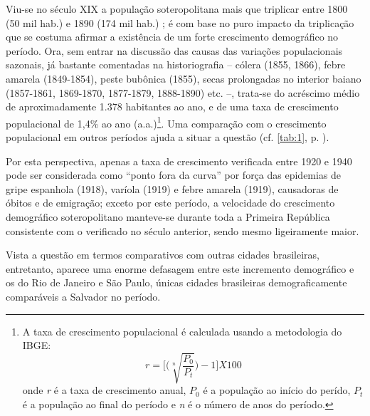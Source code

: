Viu-se no século XIX a população soteropolitana mais que triplicar entre 1800 (50 mil hab.) e 1890 (174 mil hab.) \cite[p.~70]{sampaio_formas_1999}; é com base no puro impacto da triplicação que se costuma afirmar a existência de um forte crescimento demográfico no período. Ora, sem entrar na discussão das causas das variações populacionais sazonais, já bastante comentadas na historiografia -- cólera (1855, 1866), febre amarela (1849-1854), peste bubônica (1855), secas prolongadas no interior baiano (1857-1861, 1869-1870, 1877-1879, 1888-1890) etc. --, trata-se do acréscimo médio de aproximadamente 1.378 habitantes ao ano, e de uma taxa de crescimento populacional de 1,4\% ao ano (a.a.)\footnote{A taxa de crescimento populacional é calculada usando a metodologia do IBGE: \[ r = \Bigg[ \Bigg( \sqrt[n]{\frac{P_{0}}{P_{t}}} \Bigg) - 1 \Bigg] X 100 \] onde \textit{r} é a taxa de crescimento anual, \textit{$P_{0}$} é a população ao início do perído, \textit{$P_{t}$} é a população ao final do período e \textit{n} é o número de anos do período.}. Uma comparação com o crescimento populacional em outros períodos ajuda a situar a questão (cf. \autoref{tab:1}, p. \pageref{tab:1}).



Por esta perspectiva, apenas a taxa de crescimento verificada entre 1920 e 1940 pode ser considerada como ``ponto fora da curva'' por força das epidemias de gripe espanhola (1918), varíola (1919) e febre amarela (1919), causadoras de óbitos e de emigração; exceto por este período, a velocidade do crescimento demográfico soteropolitano manteve-se durante toda a Primeira República consistente com o verificado no século anterior, sendo mesmo ligeiramente maior.

Vista a questão em termos comparativos com outras cidades brasileiras, entretanto, aparece uma enorme defasagem entre este incremento demográfico e os do Rio de Janeiro e São Paulo, únicas cidades brasileiras demograficamente comparáveis a Salvador no período.



